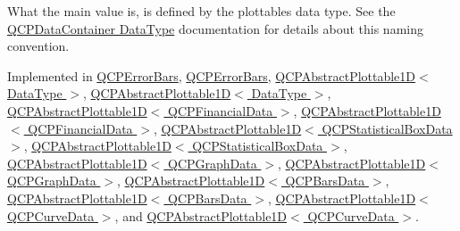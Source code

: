 What the main value is, is defined by the plottable\textquotesingle{}s data type. See the \hyperlink{class_q_c_p_data_container_qcpdatacontainer-datatype}{Q\+C\+P\+Data\+Container Data\+Type} documentation for details about this naming convention. 

Implemented in \hyperlink{class_q_c_p_error_bars_a8b5e77ae65a36a79bc77ca7181658db1}{Q\+C\+P\+Error\+Bars}, \hyperlink{class_q_c_p_error_bars_aa4ac3e906e11d23e6ad9d30f15d6f991}{Q\+C\+P\+Error\+Bars}, \hyperlink{class_q_c_p_abstract_plottable1_d_affeffff62c1d4e12ca669d1e595bda16}{Q\+C\+P\+Abstract\+Plottable1\+D$<$ Data\+Type $>$}, \hyperlink{class_q_c_p_abstract_plottable1_d_a2f64db7173d82ed2b8208a0fd73bc08b}{Q\+C\+P\+Abstract\+Plottable1\+D$<$ Data\+Type $>$}, \hyperlink{class_q_c_p_abstract_plottable1_d_affeffff62c1d4e12ca669d1e595bda16}{Q\+C\+P\+Abstract\+Plottable1\+D$<$ Q\+C\+P\+Financial\+Data $>$}, \hyperlink{class_q_c_p_abstract_plottable1_d_a2f64db7173d82ed2b8208a0fd73bc08b}{Q\+C\+P\+Abstract\+Plottable1\+D$<$ Q\+C\+P\+Financial\+Data $>$}, \hyperlink{class_q_c_p_abstract_plottable1_d_affeffff62c1d4e12ca669d1e595bda16}{Q\+C\+P\+Abstract\+Plottable1\+D$<$ Q\+C\+P\+Statistical\+Box\+Data $>$}, \hyperlink{class_q_c_p_abstract_plottable1_d_a2f64db7173d82ed2b8208a0fd73bc08b}{Q\+C\+P\+Abstract\+Plottable1\+D$<$ Q\+C\+P\+Statistical\+Box\+Data $>$}, \hyperlink{class_q_c_p_abstract_plottable1_d_affeffff62c1d4e12ca669d1e595bda16}{Q\+C\+P\+Abstract\+Plottable1\+D$<$ Q\+C\+P\+Graph\+Data $>$}, \hyperlink{class_q_c_p_abstract_plottable1_d_a2f64db7173d82ed2b8208a0fd73bc08b}{Q\+C\+P\+Abstract\+Plottable1\+D$<$ Q\+C\+P\+Graph\+Data $>$}, \hyperlink{class_q_c_p_abstract_plottable1_d_affeffff62c1d4e12ca669d1e595bda16}{Q\+C\+P\+Abstract\+Plottable1\+D$<$ Q\+C\+P\+Bars\+Data $>$}, \hyperlink{class_q_c_p_abstract_plottable1_d_a2f64db7173d82ed2b8208a0fd73bc08b}{Q\+C\+P\+Abstract\+Plottable1\+D$<$ Q\+C\+P\+Bars\+Data $>$}, \hyperlink{class_q_c_p_abstract_plottable1_d_affeffff62c1d4e12ca669d1e595bda16}{Q\+C\+P\+Abstract\+Plottable1\+D$<$ Q\+C\+P\+Curve\+Data $>$}, and \hyperlink{class_q_c_p_abstract_plottable1_d_a2f64db7173d82ed2b8208a0fd73bc08b}{Q\+C\+P\+Abstract\+Plottable1\+D$<$ Q\+C\+P\+Curve\+Data $>$}.

